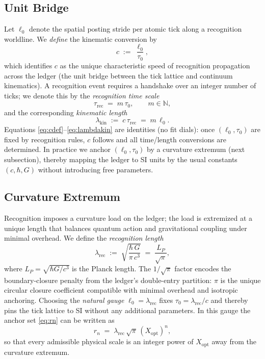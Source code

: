 \documentclass[11pt]{article}
\theoremstyle{definition}
\theoremstyle{remark}
\begin{document}
\subsection{Unit Bridge}
Let $\ell_0$ denote the spatial posting stride per atomic tick along a recognition worldline. We \emph{define} the kinematic conversion by
\begin{equation}
\label{eq:cdef}
c \;:=\; \frac{\ell_0}{\tau_0},
\end{equation}
which identifies $c$ as the unique characteristic speed of recognition propagation across the ledger (the unit bridge between the tick lattice and continuum kinematics). A recognition event requires a handshake over an integer number of ticks; we denote this by the \emph{recognition time scale}
\begin{equation}
\label{eq:taurec}
\tau_{\mathrm{rec}} \;=\; m\,\tau_0,\qquad m\in\mathbb{N},
\end{equation}
and the corresponding \emph{kinematic length}
\begin{equation}
\label{eq:lambdakin}
\lambda_{\mathrm{kin}} \;:=\; c\,\tau_{\mathrm{rec}} \;=\; m\,\ell_0.
\end{equation}
Equations \eqref{eq:cdef}--\eqref{eq:lambdakin} are identities (no fit dials): once $(\ell_0,\tau_0)$ are fixed by recognition rules, $c$ follows and all time/length conversions are determined. In practice we anchor $(\ell_0,\tau_0)$ by a curvature extremum (next subsection), thereby mapping the ledger to SI units by the usual constants $(c,\hbar,G)$ without introducing free parameters.

\subsection{Curvature Extremum}
Recognition imposes a curvature load on the ledger; the load is extremized at a unique length that balances quantum action and gravitational coupling under minimal overhead. We define the \emph{recognition length}
\begin{equation}
\label{eq:lambdarec}
\lambda_{\mathrm{rec}} \;:=\; \sqrt{\frac{\hbar\,G}{\pi\,c^3}}
\;=\; \frac{L_P}{\sqrt{\pi}},
\end{equation}
where $L_P=\sqrt{\hbar G/c^3}$ is the Planck length. The $1/\sqrt{\pi}$ factor encodes the boundary-closure penalty from the ledger’s double-entry partition: $\pi$ is the unique circular closure coefficient compatible with minimal overhead and isotropic anchoring. Choosing the \emph{natural gauge} $\ell_0=\lambda_{\mathrm{rec}}$ fixes $\tau_0=\lambda_{\mathrm{rec}}/c$ and thereby pins the tick lattice to SI without any additional parameters. In this gauge the anchor set \eqref{eq:rn} can be written as
\begin{equation}
r_n \;=\; \lambda_{\mathrm{rec}}\,\sqrt{\pi}\,(X_{\mathrm{opt}})^n,
\end{equation}
so that every admissible physical scale is an integer power of $X_{\mathrm{opt}}$ away from the curvature extremum.
\end{document}
